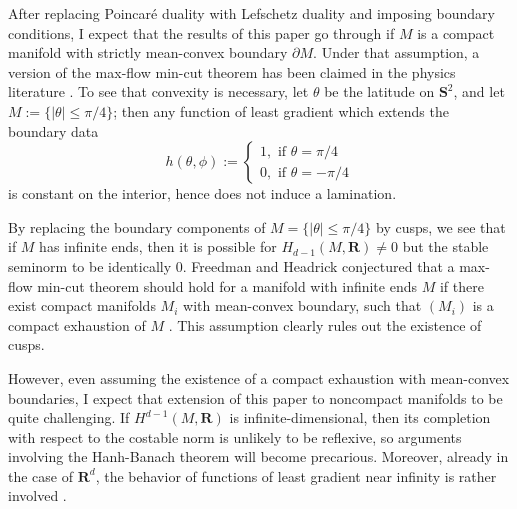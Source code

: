 \documentclass[reqno,11pt]{amsart}
\newcommand{\RR}{\mathbf{R}}
\newcommand{\Sph}{\mathbf S}
\theoremstyle{definition}
\numberwithin{equation}{section}
\begin{document}
After replacing Poincar\'e duality with Lefschetz duality and imposing boundary conditions, I expect that the results of this paper go through if $M$ is a compact manifold with strictly mean-convex boundary $\partial M$.
Under that assumption, a version of the max-flow min-cut theorem has been claimed in the physics literature \cite[Appendix A]{Freedman_2016}.
To see that convexity is necessary, let $\theta$ be the latitude on $\Sph^2$, and let $M := \{|\theta| \leq \pi/4\}$; then any function of least gradient which extends the boundary data 
$$h(\theta, \phi) := \begin{cases} 1, \text{ if } \theta = \pi/4 \\ 0, \text{ if } \theta = -\pi/4\end{cases}$$
is constant on the interior, hence does not induce a lamination.

By replacing the boundary components of $M = \{|\theta| \leq \pi/4\}$ by cusps, we see that if $M$ has infinite ends, then it is possible for $H_{d - 1}(M, \RR) \neq 0$ but the stable seminorm to be identically $0$.
Freedman and Headrick conjectured that a max-flow min-cut theorem should hold for a manifold with infinite ends $M$ if there exist compact manifolds $M_i$ with mean-convex boundary, such that $(M_i)$ is a compact exhaustion of $M$ \cite[Appendix A]{Freedman_2016}.
This assumption clearly rules out the existence of cusps.

However, even assuming the existence of a compact exhaustion with mean-convex boundaries, I expect that extension of this paper to noncompact manifolds to be quite challenging.
If $H^{d - 1}(M, \RR)$ is infinite-dimensional, then its completion with respect to the costable norm is unlikely to be reflexive, so arguments involving the Hanh-Banach theorem will become precarious.
Moreover, already in the case of $\RR^d$, the behavior of functions of least gradient near infinity is rather involved \cite[\S4.4]{górny2021}.

\end{document}
